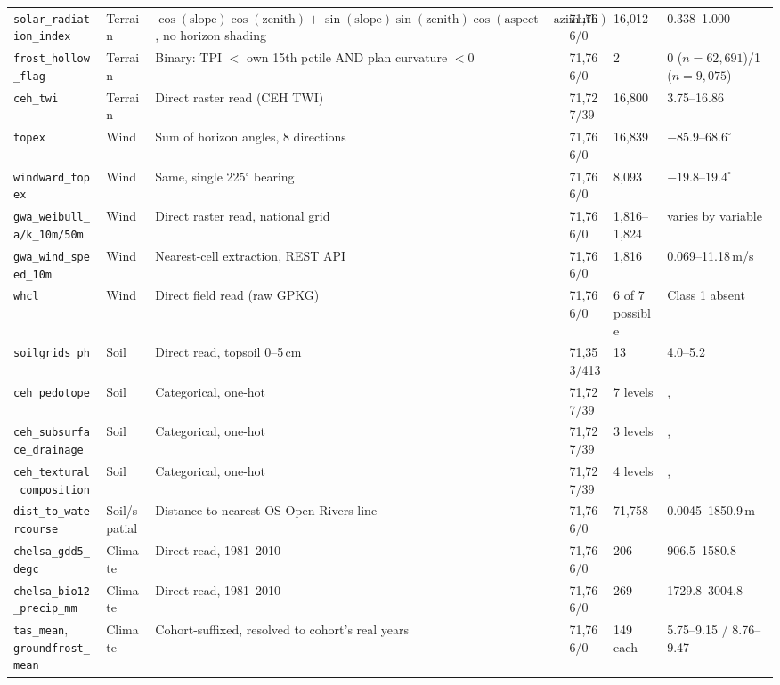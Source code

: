 \documentclass[logo,msc,ai]{infthesis}           %
\begin{document}
{\begin{longtable}{p{2.3cm}p{1.6cm}p{3.0cm}p{1.3cm}p{1.1cm}p{2.3cm}}
\texttt{solar\_radiation\_index} & Terrain & $\cos(\text{slope})\cos(\text{zenith})+\sin(\text{slope})\sin(\text{zenith})\cos(\text{aspect}-\text{azimuth})$, no horizon shading & 71{,}766/0 & 16{,}012 & 0.338--1.000 \\
\texttt{frost\_hollow\_flag} & Terrain & Binary: TPI $<$ own 15th pctile AND plan curvature $<0$ & 71{,}766/0 & 2 & 0 ($n{=}62{,}691$)/1 ($n{=}9{,}075$) \\
\texttt{ceh\_twi} & Terrain & Direct raster read (CEH TWI) & 71{,}727/39 & 16{,}800 & 3.75--16.86 \\
\texttt{topex} & Wind & Sum of horizon angles, 8 directions \citep{wilson1984} & 71{,}766/0 & 16{,}839 & $-85.9$--$68.6^\circ$ \\
\texttt{windward\_topex} & Wind & Same, single 225$^\circ$ bearing & 71{,}766/0 & 8{,}093 & $-19.8$--$19.4^\circ$ \\
\texttt{gwa\_weibull\_a/k\_10m/50m} & Wind & Direct raster read, national grid & 71{,}766/0 & 1{,}816--1{,}824 & varies by variable \\
\texttt{gwa\_wind\_speed\_10m} & Wind & Nearest-cell extraction, REST API & 71{,}766/0 & 1{,}816 & 0.069--11.18\,m/s \\
\texttt{whcl} & Wind & Direct field read (raw GPKG) & 71{,}766/0 & 6 of 7 possible & Class 1 absent \\
\texttt{soilgrids\_ph} & Soil & Direct read, topsoil 0--5\,cm & 71{,}353/413 & 13 & 4.0--5.2 \\
\texttt{ceh\_pedotope} & Soil & Categorical, one-hot & 71{,}727/39 & 7 levels &, \\
\texttt{ceh\_subsurface\_drainage} & Soil & Categorical, one-hot & 71{,}727/39 & 3 levels &, \\
\texttt{ceh\_textural\_composition} & Soil & Categorical, one-hot & 71{,}727/39 & 4 levels &, \\
\texttt{dist\_to\_watercourse} & Soil/spatial & Distance to nearest OS Open Rivers line & 71{,}766/0 & 71{,}758 & 0.0045--1850.9\,m \\
\texttt{chelsa\_gdd5\_degc} & Climate & Direct read, 1981--2010 & 71{,}766/0 & 206 & 906.5--1580.8 \\
\texttt{chelsa\_bio12\_precip\_mm} & Climate & Direct read, 1981--2010 & 71{,}766/0 & 269 & 1729.8--3004.8 \\
\texttt{tas\_mean}, \texttt{groundfrost\_mean} & Climate & Cohort-suffixed, resolved to cohort's real years & 71{,}766/0 & 149 each & 5.75--9.15 / 8.76--9.47 \\

\end{longtable}}
\end{document}
